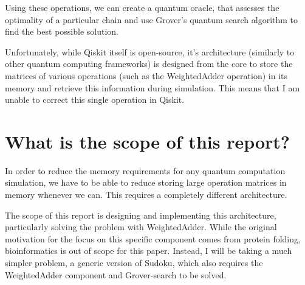 Using these operations, we can create a quantum oracle, that assesses the optimality of a particular chain and use Grover's quantum search algorithm to find the best possible solution.

Unfortunately, while Qiskit itself is open-source, it's architecture (similarly to other quantum computing frameworks) is designed from the core to store the matrices of various operations (such as the WeightedAdder operation) in its memory and retrieve this information during simulation. This means that I am unable to correct this single operation in Qiskit.

\section{What is the scope of this report?}

In order to reduce the memory requirements for any quantum computation simulation, we have to be able to reduce storing large operation matrices in memory whenever we can. This requires a completely different architecture.

The scope of this report is designing and implementing this architecture, particularly solving the problem with WeightedAdder. While the original motivation for the focus on this specific component comes from protein folding, bioinformatics is out of scope for this paper. Instead, I will be taking a much simpler problem, a generic version of Sudoku, which also requires the WeightedAdder component and Grover-search to be solved.
